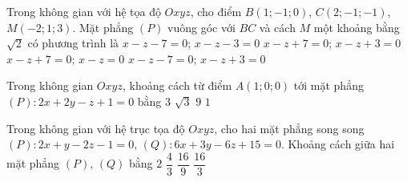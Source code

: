 \begin{ex}%
	Trong không gian với hệ tọa độ $Oxyz$, cho điểm $B(1;-1;0)$, $C(2;-1;-1)$, $M(-2;1;3)$. Mặt phẳng $(P)$ vuông góc với $BC$ và cách $M$  một khoảng bằng $\sqrt{2}$ có phương trình là
	 \choice
		{$x - z -  7 = 0$; $x - z - 3 = 0$}
		{\True $x -  z + 7 = 0$; $x - z + 3 = 0$}
		{$x - z + 7 =  0$; $x - z = 0$}
		{$x - z - 7 = 0$; $x - z  + 3 = 0$}
\end{ex}

\begin{ex}%
	 Trong không gian $Oxyz$, khoảng cách từ điểm $A(1;0;0)$ tới mặt phẳng $(P)\colon 2x+2y-z+1=0$ bằng
	\choice 
		{$3$} 
		 {$\sqrt{3}$}
		 {$9$}
		{\True  $1$}
\end{ex}

\begin{ex}%
	Trong không gian với hệ trục tọa độ $Oxyz$, cho hai mặt phẳng  song song $(P)\colon 2x+y-2z-1=0$, $(Q)\colon 6x+3y-6z+15=0$. Khoảng cách giữa hai mặt phẳng $(P)$, $(Q)$ bằng
	 \choice
		 {\True $2$}
		{$\dfrac{4}{3}$} 
		 {$\dfrac{16}{9}$}
		{$\dfrac{16}{3}$} 
\end{ex}

